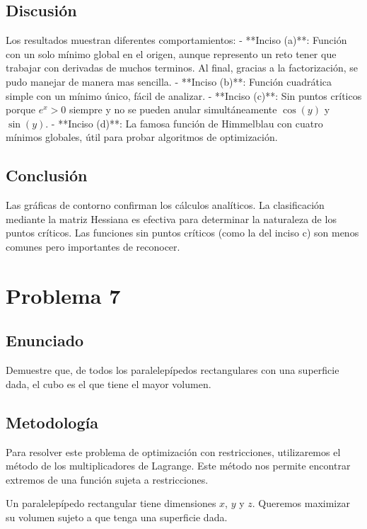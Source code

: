 \documentclass{article}
\begin{document}
\subsection{Discusión}

Los resultados muestran diferentes comportamientos:
- **Inciso (a)**: Función con un solo mínimo global en el origen, aunque represento un reto tener que trabajar con derivadas de muchos terminos. Al final, gracias a la factorización, se pudo manejar de manera mas sencilla.
- **Inciso (b)**: Función cuadrática simple con un mínimo único, fácil de analizar.
- **Inciso (c)**: Sin puntos críticos porque $e^x > 0$ siempre y no se pueden anular simultáneamente $\cos(y)$ y $\sin(y)$.
- **Inciso (d)**: La famosa función de Himmelblau con cuatro mínimos globales, útil para probar algoritmos de optimización.

\subsection{Conclusión}

Las gráficas de contorno confirman los cálculos analíticos. La clasificación mediante la matriz Hessiana es efectiva para determinar la naturaleza de los puntos críticos. Las funciones sin puntos críticos (como la del inciso c) son menos comunes pero importantes de reconocer.

\section{Problema 7}

\subsection{Enunciado}
Demuestre que, de todos los paralelepípedos rectangulares con una superficie dada, el cubo es el que tiene el mayor volumen.

\subsection{Metodología}

Para resolver este problema de optimización con restricciones, utilizaremos el método de los multiplicadores de Lagrange. Este método nos permite encontrar extremos de una función sujeta a restricciones. 

Un paralelepípedo rectangular tiene dimensiones $x$, $y$ y $z$. Queremos maximizar su volumen sujeto a que tenga una superficie dada.
\end{document}
